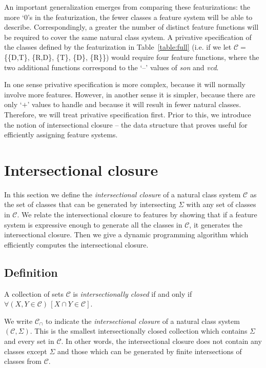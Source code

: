 \documentclass[11pt, oneside]{article}   	%
\begin{document}
\noindent An important generalization emerges from comparing these featurizations: the more `$0$'s in the featurization, the fewer classes a feature system will be able to describe. Correspondingly, a greater the number of distinct feature functions will be required to cover the same natural class system. A privative specification of the classes defined by the featurization in Table~\ref{table:full} (i.e. if we let $\mathcal{C} =$ \{\{D,T\}, \{R,D\}, \{T\}, \{D\}, \{R\}\}) would require four feature functions, where the two additional functions correspond to the `--' values of \textit{son} and \textit{vcd}.

In one sense privative specification is more complex, because it will normally involve more features. However, in another sense it is simpler, because there are only `$+$' values to handle and because it will result in fewer natural classes. Therefore, we will treat privative specification first. Prior to this, we introduce the notion of intersectional closure -- the data structure that proves useful for efficiently assigning feature systems.

\section{Intersectional closure}

In this section we define the \textit{intersectional closure} of a natural class system $\mathcal{C}$ as the set of classes that can be generated by intersecting $\Sigma$ with any set of classes in $\mathcal{C}$. We relate the intersectional closure to features by showing that if a feature system is expressive enough to generate all the classes in $\mathcal{C}$, it generates the intersectional closure. Then we give a dynamic programming algorithm which efficiently computes the intersectional closure. 

\subsection{Definition}

A collection of sets $\mathcal C$ is \textit{intersectionally closed} if and only if $\forall (X, Y \in \mathcal C) \, [ X \cap Y \in \mathcal C]$.

We write $\mathcal C_\cap$ to indicate the \textit{intersectional closure} of a natural class system $(\mathcal C, \Sigma)$. This is the smallest intersectionally closed collection which contains $\Sigma$ and every set in $\mathcal C$. In other words, the intersectional closure does not contain any classes except $\Sigma$ and those which can be generated by finite intersections of classes from $\mathcal C$.
\end{document}

